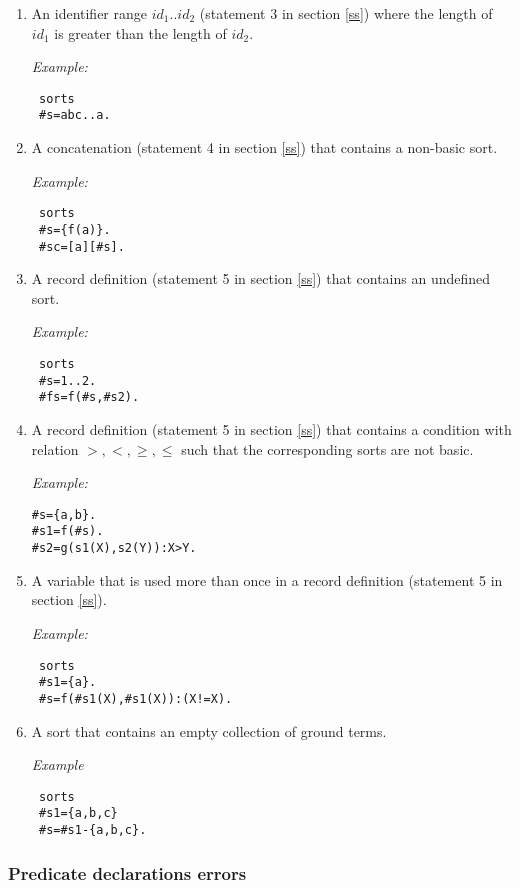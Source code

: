 \documentclass[12pt, letterpaper]{article}
\begin{document}
\begin{enumerate}
\item An identifier range $id_1..id_2$ (statement 3 in section \ref{ss}) where  the length of $id_1$ is greater than the length of $id_2$. 


\textit{Example:}
\begin{verbatim}
 sorts
 #s=abc..a.
\end{verbatim}

\item A concatenation (statement  4 in section \ref{ss}) that contains a non-basic sort.

\textit{Example:}
\begin{verbatim}
 sorts
 #s={f(a)}.
 #sc=[a][#s].
\end{verbatim}



\item A record definition (statement 5 in section \ref{ss}) that contains an undefined sort.

\textit{Example:}
\begin{verbatim}
 sorts
 #s=1..2.
 #fs=f(#s,#s2).
\end{verbatim}



\item A record definition  (statement 5 in section \ref{ss}) that contains a condition with relation $>,<,\geq,\leq$ such that the
   corresponding sorts are not basic.

\textit{Example:}
\begin{verbatim}
#s={a,b}.
#s1=f(#s). 
#s2=g(s1(X),s2(Y)):X>Y.
\end{verbatim}

\item  A variable that is used more than once in a record definition (statement  5 in section \ref{ss}).

\textit{Example:}

\begin{verbatim}
 sorts
 #s1={a}.
 #s=f(#s1(X),#s1(X)):(X!=X).
\end{verbatim}
\item A sort that contains an empty collection of ground terms.

\textit{Example}
\begin{verbatim}
 sorts
 #s1={a,b,c}
 #s=#s1-{a,b,c}.
\end{verbatim}
\end{enumerate}
\subsubsection{Predicate declarations errors}
\end{document}
